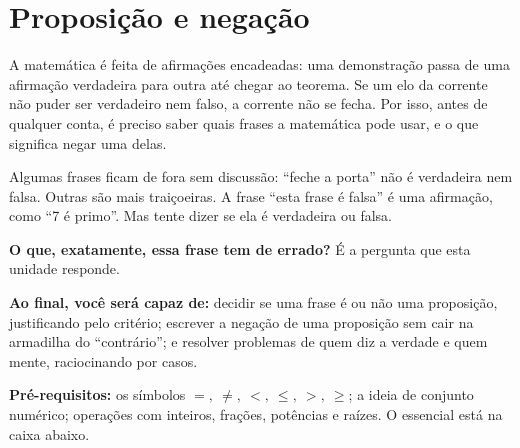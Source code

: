 \providecommand{\nao}{{\sim}}
\section{Proposição e negação}

\Prefacio
\begin{prefacio}

A matemática é feita de afirmações encadeadas: uma demonstração passa de uma afirmação verdadeira para outra até chegar ao teorema. Se um elo da corrente não puder ser verdadeiro nem falso, a corrente não se fecha. Por isso, antes de qualquer conta, é preciso saber quais frases a matemática pode usar, e o que significa negar uma delas.

Algumas frases ficam de fora sem discussão: \enquote{feche a porta} não é verdadeira nem falsa. Outras são mais traiçoeiras. A frase \enquote{esta frase é falsa} é uma afirmação, como \enquote{7 é primo}. Mas tente dizer se ela é verdadeira ou falsa.

\textbf{O que, exatamente, essa frase tem de errado?} É a pergunta que esta unidade responde.

\textbf{Ao final, você será capaz de:} decidir se uma frase é ou não uma proposição, justificando pelo critério; escrever a negação de uma proposição sem cair na armadilha do \enquote{contrário}; e resolver problemas de quem diz a verdade e quem mente, raciocinando por casos.

\textbf{Pré-requisitos:} os símbolos $=,\ \neq,\ <,\ \le,\ >,\ \ge$; a ideia de conjunto numérico; operações com inteiros, frações, potências e raízes. O essencial está na caixa abaixo.
\end{prefacio}

